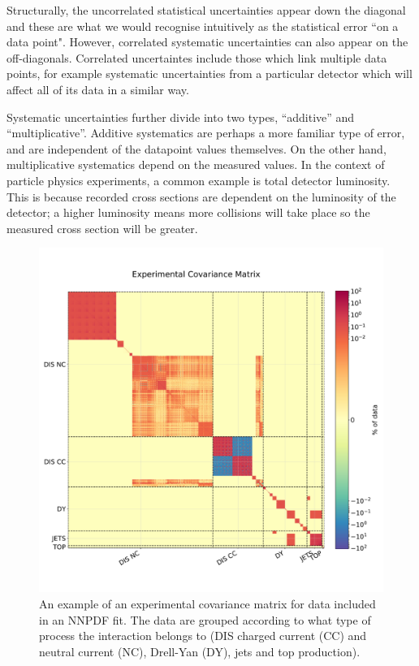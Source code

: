 Structurally, the uncorrelated statistical uncertainties appear down the diagonal and these are what we would recognise intuitively as the statistical error ``on a data point". However, correlated
systematic uncertainties can also appear on the off-diagonals. Correlated uncertaintes include
those which link multiple data points, for example systematic uncertainties from a particular
detector which will affect all of its data in a similar way.

Systematic uncertainties further divide into two types, ``additive'' and ``multiplicative''.
Additive systematics are perhaps a more familiar type of error, and are independent of the
datapoint values themselves. On the other hand,  multiplicative systematics depend on the measured values. In the context of particle physics 
experiments, a common example is total detector luminosity. This is because recorded cross
sections are dependent on the luminosity of the detector; a higher luminosity means more
collisions will take place so the measured cross section will be greater.

\begin{figure}
\centering
\includegraphics[width=15cm]{background/exp_covmat.pdf}
\caption{An example of an experimental covariance matrix for data included in an NNPDF fit. The data are grouped according to what type of process the interaction belongs to (DIS charged current (CC) and neutral current (NC), Drell-Yan (DY), jets and top production).}
\label{fig:expcovmat}
\end{figure}

